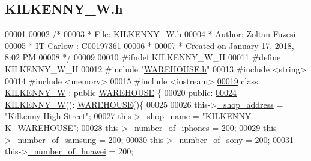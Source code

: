 \hypertarget{_k_i_l_k_e_n_n_y___w_8h_source}{}\subsection{K\+I\+L\+K\+E\+N\+N\+Y\+\_\+\+W.\+h}

\begin{DoxyCode}
00001 
00002 \textcolor{comment}{/* }
00003 \textcolor{comment}{ * File:   KILKENNY\_W.h}
00004 \textcolor{comment}{ * Author: Zoltan Fuzesi}
00005 \textcolor{comment}{ * IT Carlow : C00197361}
00006 \textcolor{comment}{ *}
00007 \textcolor{comment}{ * Created on January 17, 2018, 8:02 PM}
00008 \textcolor{comment}{ */}
00009 
00010 \textcolor{preprocessor}{#ifndef KILKENNY\_W\_H}
00011 \textcolor{preprocessor}{#define KILKENNY\_W\_H}
00012 \textcolor{preprocessor}{#include "\hyperlink{_w_a_r_e_h_o_u_s_e_8h}{WAREHOUSE.h}"}
00013 \textcolor{preprocessor}{#include <string>}
00014 \textcolor{preprocessor}{#include <memory>}
00015 \textcolor{preprocessor}{#include <iostream>}
\hypertarget{_k_i_l_k_e_n_n_y___w_8h_source.tex_l00019}{}\hyperlink{class_k_i_l_k_e_n_n_y___w}{00019} \textcolor{keyword}{class }\hyperlink{class_k_i_l_k_e_n_n_y___w}{KILKENNY\_W} : \textcolor{keyword}{public} \hyperlink{class_w_a_r_e_h_o_u_s_e}{WAREHOUSE} \{
00020 \textcolor{keyword}{public}:
\hypertarget{_k_i_l_k_e_n_n_y___w_8h_source.tex_l00024}{}\hyperlink{class_k_i_l_k_e_n_n_y___w_aee4c4b30bc934ff827f0851077b7fbab_aee4c4b30bc934ff827f0851077b7fbab}{00024}     \hyperlink{class_k_i_l_k_e_n_n_y___w_aee4c4b30bc934ff827f0851077b7fbab_aee4c4b30bc934ff827f0851077b7fbab}{KILKENNY\_W}(): \hyperlink{class_w_a_r_e_h_o_u_s_e}{WAREHOUSE}()\{
00025         
00026         this->\hyperlink{class_k_i_l_k_e_n_n_y___w_a278c416a60d21ee6ffa400f6d1348fd5_a278c416a60d21ee6ffa400f6d1348fd5}{\_shop\_address} = \textcolor{stringliteral}{"Kilkenny High Street"};
00027         this->\hyperlink{class_k_i_l_k_e_n_n_y___w_a3ca31fe82131bef3b13759e6d8b9a83b_a3ca31fe82131bef3b13759e6d8b9a83b}{\_shop\_name} = \textcolor{stringliteral}{"KILKENNY K\_WAREHOUSE"};
00028         this->\hyperlink{class_k_i_l_k_e_n_n_y___w_a91935316f3da1d18589f7d02ec0ac24c_a91935316f3da1d18589f7d02ec0ac24c}{\_number\_of\_iphones} = 200;
00029         this->\hyperlink{class_k_i_l_k_e_n_n_y___w_abf89dc9f1d933e77c3597d2835c692a0_abf89dc9f1d933e77c3597d2835c692a0}{\_number\_of\_samsung} = 200;
00030         this->\hyperlink{class_k_i_l_k_e_n_n_y___w_a9b12aacf712ccf9e082daf450bbfbe8d_a9b12aacf712ccf9e082daf450bbfbe8d}{\_number\_of\_sony} = 200;
00031         this->\hyperlink{class_k_i_l_k_e_n_n_y___w_a5aedbf8c3815df0d35a94ed9105f6574_a5aedbf8c3815df0d35a94ed9105f6574}{\_number\_of\_huawei} = 200;

\end{DoxyCode}
